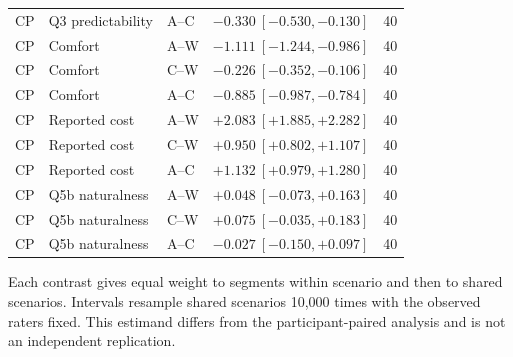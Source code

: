 \begin{longtable}{lllrr}
CP & Q3 predictability & A--C & $-0.330\ [-0.530,-0.130]$ & 40 \\
CP & Comfort & A--W & $-1.111\ [-1.244,-0.986]$ & 40 \\
CP & Comfort & C--W & $-0.226\ [-0.352,-0.106]$ & 40 \\
CP & Comfort & A--C & $-0.885\ [-0.987,-0.784]$ & 40 \\
CP & Reported cost & A--W & $+2.083\ [+1.885,+2.282]$ & 40 \\
CP & Reported cost & C--W & $+0.950\ [+0.802,+1.107]$ & 40 \\
CP & Reported cost & A--C & $+1.132\ [+0.979,+1.280]$ & 40 \\
CP & Q5b naturalness & A--W & $+0.048\ [-0.073,+0.163]$ & 40 \\
CP & Q5b naturalness & C--W & $+0.075\ [-0.035,+0.183]$ & 40 \\
CP & Q5b naturalness & A--C & $-0.027\ [-0.150,+0.097]$ & 40 \\
\end{longtable}
\endgroup


Each contrast gives equal weight to segments within scenario and then to shared scenarios. Intervals resample shared scenarios 10,000 times with the observed raters fixed. This estimand differs from the participant-paired analysis and is not an independent replication.

